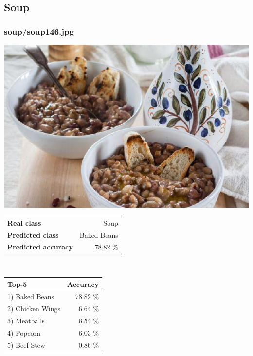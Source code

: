 \subsection{Soup}
    
\subsubsection{soup/soup146.jpg}

\begin{minipage}[t]{0.4\textwidth}
	\vspace{0pt}
	\includegraphics[width=\linewidth]{images/evaluation-images/soup/soup146.jpg}
\end{minipage}
\hfill
\begin{minipage}[t]{0.5\textwidth}
	\vspace{0pt}\raggedright
	\begin{tabularx}{\textwidth}{X r}
		\small \textbf{Real class} & \small Soup\\
		\small \textbf{Predicted class} & \small Baked Beans\\
		\small \textbf{Predicted accuracy} & \small 78.82 \%
    \end{tabularx}\\
    
    \vspace{6pt}
	\begin{tabularx}{\textwidth}{X r}
        \small \textbf{Top-5} & \small \textbf{Accuracy} \\
        \hline
		\small 1) Baked Beans & \small 78.82 \%\\\small 2) Chicken Wings & \small 6.64 \%\\\small 3) Meatballs & \small 6.54 \%\\\small 4) Popcorn & \small 6.03 \%\\\small 5) Beef Stew & \small 0.86 \%
    \end{tabularx}
\end{minipage}
    

